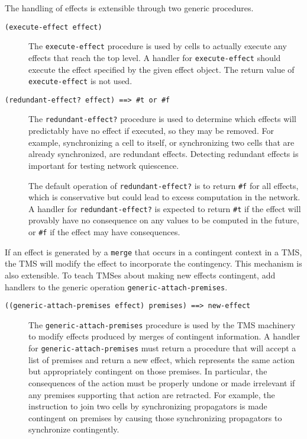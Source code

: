 \documentclass[12pt,letterpaper,english]{article}
\begin{document}
The handling of effects is extensible through two generic procedures.
\begin{description}
\item[{\texttt{(execute-effect effect)}}] \leavevmode 
The \texttt{execute-effect} procedure is used by cells to actually
execute any effects that reach the top level.  A handler for
\texttt{execute-effect} should execute the effect specified by the given
effect object.  The return value of \texttt{execute-effect} is not used.

\item[{\texttt{(redundant-effect? effect)  ==>  {\#}t or {\#}f}}] \leavevmode 
The \texttt{redundant-effect?} procedure is used to determine which
effects will predictably have no effect if executed, so they may be
removed.  For example, synchronizing a cell to itself, or
synchronizing two cells that are already synchronized, are redundant
effects.  Detecting redundant effects is important for testing
network quiescence.

The default operation of \texttt{redundant-effect?} is to return \texttt{{\#}f}
for all effects, which is conservative but could lead to excess
computation in the network.  A handler for \texttt{redundant-effect?} is
expected to return \texttt{{\#}t} if the effect will provably have no
consequence on any values to be computed in the future, or \texttt{{\#}f} if
the effect may have consequences.

\end{description}

If an effect is generated by a \texttt{merge} that occurs in a contingent
context in a TMS, the TMS will modify the effect to incorporate the
contingency.  This mechanism is also extensible.  To teach TMSes
about making new effects contingent, add handlers to the generic
operation \texttt{generic-attach-premises}.
\begin{description}
\item[{\texttt{((generic-attach-premises effect) premises)  ==>  new-effect}}] \leavevmode 
The \texttt{generic-attach-premises} procedure is used by the TMS
machinery to modify effects produced by merges of contingent
information.  A handler for \texttt{generic-attach-premises} must return
a procedure that will accept a list of premises and return a new
effect, which represents the same action but appropriately
contingent on those premises.  In particular, the consequences of
the action must be properly undone or made irrelevant if any
premises supporting that action are retracted.  For example, the
instruction to join two cells by synchronizing propagators is made
contingent on premises by causing those synchronizing propagators to
synchronize contingently.

\end{description}
\end{document}
